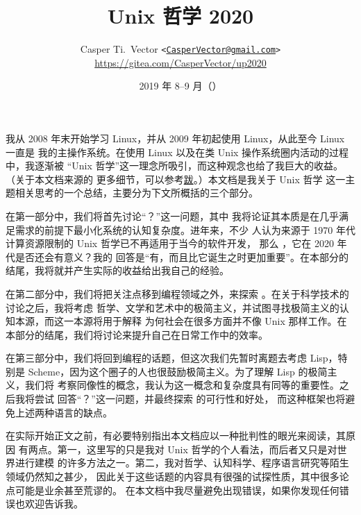 \documentclass[UTF8]{ctexart}
\begin{document}
\title{\textbf{Unix 哲学 2020}}
\author{%
	Casper Ti.\ Vector
	\texttt{<\url{CasperVector@gmail.com}>}\\
	\url{https://gitea.com/CasperVector/up2020}%
}
\date{2019 年 8--9 月（\docversion）}
\maketitle
\vspace{\baselineskip}
\tableofcontents


我从 2008 年末开始学习 Linux，并从 2009 年初起使用 Linux，从此至今 Linux 一直是
我的主操作系统。在使用 Linux 以及在类 Unix 操作系统圈内活动的过程中，我逐渐被
“Unix 哲学”这一理念所吸引，而这种观念也给了我巨大的收益。（关于本文档来源的
更多细节，可以参考\hyperref[sec:afterword]{跋}。）本文档是我关于 Unix 哲学
这一主题相关思考的一个总结，主要分为下文所概括的三个部分。

在第一部分中，我们将首先讨论“？”这一问题，其中
我将论证其本质是在几乎满足需求的前提下最小化系统的认知复杂度。进年来，不少
人认为来源于 1970 年代计算资源限制的 Unix 哲学已不再适用于当今的软件开发，
那么 ，它在 2020 年代是否还会有意义？我的
回答是“有，而且比它诞生之时更加重要”。在本部分的结尾，我将就并产生实际的收益给出我自己的经验。

在第二部分中，我们将把关注点移到编程领域之外，来探索 。在关于科学技术的讨论之后，我将考虑
哲学、文学和艺术中的极简主义，并试图寻找极简主义的认知本源，而这一本源将用于解释
为何社会在很多方面并不像 Unix 那样工作。在本部分的结尾，我们将讨论来提升自己在日常工作中的效率。

在第三部分中，我们将回到编程的话题，但这次我们先暂时离题去考虑 Lisp，特别是
Scheme，因为这个圈子的人也很鼓励极简主义。为了理解 Lisp 的极简主义，我们将
考察同像性的概念，我认为这一概念和复杂度具有同等的重要性。之后我将尝试
回答“？”这一问题，并最终探索%
的可行性和好处，
而这种框架也将避免上述两种语言的缺点。

在实际开始正文之前，有必要特别指出本文档应以一种批判性的眼光来阅读，其原因
有两点。第一，这里写的只是我对 Unix 哲学的个人看法，而后者又只是对世界进行建模
的许多方法之一。第二，我对哲学、认知科学、程序语言研究等陌生领域仍然知之甚少，
因此关于这些话题的内容具有很强的试探性质，其中很多论点可能是业余甚至荒谬的。
在本文档中我尽量避免出现错误，如果你发现任何错误也欢迎告诉我。
\end{document}
